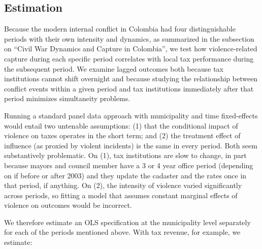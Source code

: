 \subsection{Estimation} 

Because the modern internal conflict in Colombia had four distinguishable periods with their own intensity and dynamics, as summarized in the subsection on ``Civil War Dynamics and Capture in Colombia'', we test how violence-related capture during each specific period correlates with local tax performance during the subsequent period. We examine lagged outcomes both because tax institutions cannot shift overnight and because studying the relationship between conflict events within a given period and tax institutions immediately after that period minimizes simultaneity problems. 

Running a standard panel data approach with municipality and time fixed-effects would entail two untenable assumptions: (1) that the conditional impact of violence on taxes operates in the short term; and (2) the treatment effect of influence (as proxied by violent incidents) is the same in every period. Both seem substantively problematic. On (1), tax institutions are slow to change, in part because mayors and council member have a 3 or 4 year office period (depending on if before or after 2003) and they update the cadaster and the rates once in that period, if anything. On (2), the intensity of violence varied significantly across periods, so fitting a model that assumes constant marginal effects of violence on outcomes would be incorrect. 

We therefore estimate an OLS specification at the municipality level separately for each of the periods mentioned above. With tax revenue, for example, we estimate:

